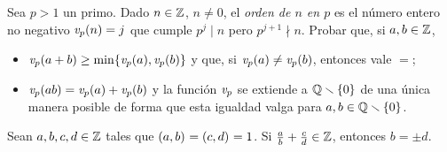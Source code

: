 

\begin{ejerPrimos}\label{ejer:primos:orden}
	Sea $p>1$ un primo. Dado $n\in\Enteros$, $n\neq 0$, el
	\emph{orden de $n$ en $p$} es el n\'umero entero no negativo
	$\valuacion[p](n)=j$ que cumple $p^j\mid n$ pero $p^{j+1}\nmid n$.
	Probar que, si $a,b\in\Enteros$,
	\begin{itemize}
		\item
			\begin{math}
				\valuacion[p](a+b)\geq\min\{
					\valuacion[p](a),\valuacion[p](b)\}
			\end{math}
			y que, si
			\begin{math}
				\valuacion[p](a)\neq \valuacion[p](b)
			\end{math},
			entonces vale $=$;
		\item
			\begin{math}
				\valuacion[p](ab)=\valuacion[p](a)+
					\valuacion[p](b)
			\end{math}
			y la funci\'on $\valuacion[p]$ se extiende a
			$\Racionales\setmin\{0\}$ de una \'unica manera
			posible de forma que esta igualdad valga para
			$a,b\in\Racionales\setmin\{0\}$.
	\end{itemize}
\end{ejerPrimos}

\begin{ejerPrimos}
	Sean $a,b,c,d\in\Enteros$ tales que $\mcd{a,b}=\mcd{c,d}=1$.
	Si $\frac a{b}+\frac c{d}\in\Enteros$, entonces $b=\pm d$.
\end{ejerPrimos}

